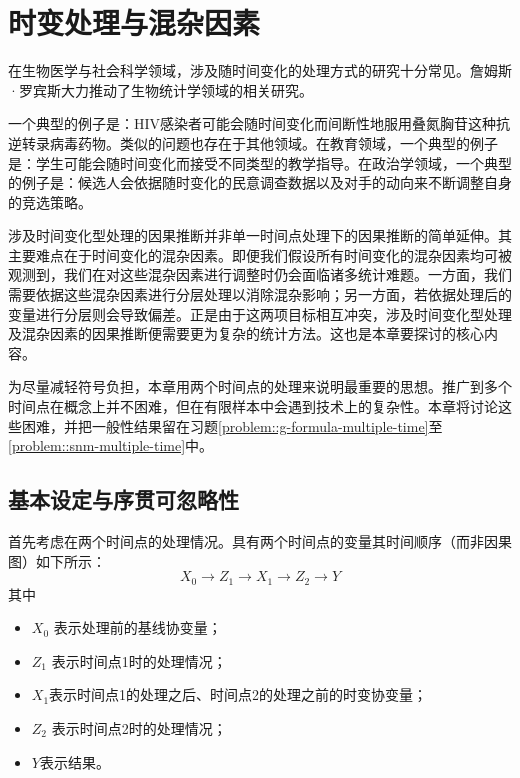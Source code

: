  
\chapter{时变处理与混杂因素}
 \label{chapter::timevarying}
 

在生物医学与社会科学领域，涉及随时间变化的处理方式的研究十分常见。詹姆斯·罗宾斯大力推动了生物统计学领域的相关研究。

一个典型的例子是：HIV感染者可能会随时间变化而间断性地服用叠氮胸苷这种抗逆转录病毒药物\citep{robins2000marginal, hernan2000marginal}。类似的问题也存在于其他领域。在教育领域，一个典型的例子是：学生可能会随时间变化而接受不同类型的教学指导\citep{hong2008causal}。在政治学领域，一个典型的例子是：候选人会依据随时变化的民意调查数据以及对手的动向来不断调整自身的竞选策略\citep{blackwell2013framework}。 


涉及时间变化型处理的因果推断并非单一时间点处理下的因果推断的简单延伸。其主要难点在于时间变化的混杂因素。即便我们假设所有时间变化的混杂因素均可被观测到，我们在对这些混杂因素进行调整时仍会面临诸多统计难题。一方面，我们需要依据这些混杂因素进行分层处理以消除混杂影响；另一方面，若依据处理后的变量进行分层则会导致偏差。正是由于这两项目标相互冲突，涉及时间变化型处理及混杂因素的因果推断便需要更为复杂的统计方法。这也是本章要探讨的核心内容。 

 


为尽量减轻符号负担，本章用两个时间点的处理来说明最重要的思想。推广到多个时间点在概念上并不困难，但在有限样本中会遇到技术上的复杂性。本章将讨论这些困难，并把一般性结果留在习题\ref{problem::g-formula-multiple-time}至\ref{problem::snm-multiple-time}中。 



\section{基本设定与序贯可忽略性}


首先考虑在两个时间点的处理情况。具有两个时间点的变量其时间顺序（而非因果图）如下所示：
$$
X_0 \rightarrow Z_1 \rightarrow X_1 \rightarrow Z_2 \rightarrow Y 
$$
其中 
\begin{itemize}
\item
$X_0$ 表示处理前的基线协变量；
\item
$Z_1$ 表示时间点1时的处理情况；
\item
$X_1$表示时间点1的处理之后、时间点2的处理之前的时变协变量；
\item
$Z_2$ 表示时间点2时的处理情况；
\item
$Y$表示结果。 
\end{itemize}


